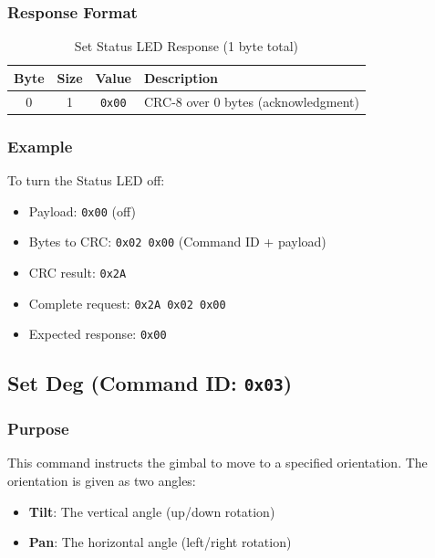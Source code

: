 \documentclass[12pt, titlepage]{article}
\begin{document}
\subsubsection{Response Format}

\begin{table}[H]
  \centering
  \begin{tabular}{cccl}
    \toprule
    \textbf{Byte} & \textbf{Size} & \textbf{Value} & \textbf{Description}                \\
    \midrule
    0             & 1             & \texttt{0x00}  & CRC-8 over 0 bytes (acknowledgment) \\
    \bottomrule
  \end{tabular}
  \caption{Set Status LED Response (1 byte total)}
\end{table}

\subsubsection{Example}

To turn the Status LED off:
\begin{itemize}
  \item Payload: \texttt{0x00} (off)
  \item Bytes to CRC: \texttt{0x02 0x00} (Command ID + payload)
  \item CRC result: \texttt{0x2A}
  \item Complete request: \texttt{0x2A 0x02 0x00}
  \item Expected response: \texttt{0x00}
\end{itemize}

\subsection{Set Deg (Command ID: \texttt{0x03})}

\subsubsection{Purpose}
This command instructs the gimbal to move to a specified orientation. The
orientation is given as two angles:
\begin{itemize}
  \item \textbf{Tilt}: The vertical angle (up/down rotation)
  \item \textbf{Pan}: The horizontal angle (left/right rotation)
\end{itemize}
\end{document}
